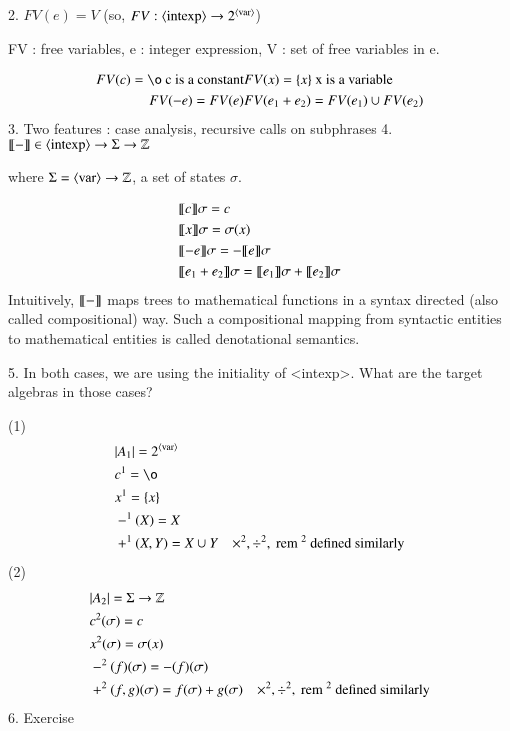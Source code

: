 \documentclass{report}[12pt]
\begin{document}
2. $FV(e) = V$ (so, $FV:\langle \text{intexp}\rangle \rightarrow 2^{\langle \text{var}\rangle}$)

FV : free variables, e : integer expression, V : set of free variables in e.

\begin{align*}
    FV(c) = \o \text{ c is a constant}& FV(x) = \{x\} \text{ x is a variable}\\
    FV(-e) = FV(e) & FV(e_1 + e_2) = FV(e_1) \cup FV(e_2)
\end{align*}
3. Two features : case analysis, recursive calls on subphrases
4. $\llbracket  -  \rrbracket \in \langle \text{intexp}\rangle \rightarrow \Sigma \rightarrow \mathbb{Z}$

where $\Sigma = \langle \text{var}\rangle \rightarrow \mathbb{Z}$, a set of states $\sigma$.

\begin{align*}
    &\llbracket  c  \rrbracket \sigma = c \\
    &\llbracket  x  \rrbracket \sigma = \sigma(x) \\
    &\llbracket  -e  \rrbracket \sigma = - \llbracket  e  \rrbracket \sigma \\
    &\llbracket  e_1 + e_2  \rrbracket \sigma = \llbracket  e_1  \rrbracket \sigma + \llbracket  e_2  \rrbracket \sigma
\end{align*}
Intuitively, $\llbracket  -  \rrbracket$ maps trees to mathematical functions in a syntax directed (also called compositional) way. Such a compositional mapping from syntactic entities to mathematical entities is called denotational semantics.

5. In both cases, we are using the initiality of <intexp>. What are the target algebras in those cases?

(1) \begin{align*}
    &|A_1| = 2^{\nonterminal{var}} \\
    &c^1 = \o \\
    &x^1 = \{x\}\\
    &-^1 (X) = X \\
    &+^1 (X, Y) = X\cup Y & \times^2, \div^2, \rem^2 \text{ defined similarly}
\end{align*}
(2)
\begin{align*}
    &|A_2| = \Sigma \rightarrow \mathbb{Z} \\
    &c^2 (\sigma) = c\\
    &x^2 (\sigma) = \sigma(x) \\
    &-^2 (f)(\sigma) = -(f)(\sigma) \\
    &+^2 (f, g)(\sigma) = f(\sigma) + g(\sigma) & \times^2, \div^2, \text{ rem }^2 \text{ defined similarly}
\end{align*}
6. Exercise
\end{document}
